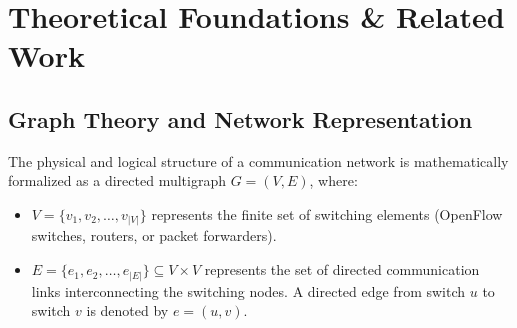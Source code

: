 \chapter{Theoretical Foundations \& Related Work}
\label{chap:theory}

\section{Graph Theory and Network Representation}
The physical and logical structure of a communication network is mathematically formalized as a directed multigraph $G = (V, E)$, where:
\begin{itemize}
    \item $V = \{v_1, v_2, \dots, v_{|V|}\}$ represents the finite set of switching elements (OpenFlow switches, routers, or packet forwarders).
    \item $E = \{e_1, e_2, \dots, e_{|E|}\} \subseteq V \times V$ represents the set of directed communication links interconnecting the switching nodes. A directed edge from switch $u$ to switch $v$ is denoted by $e = (u, v)$.
\end{itemize}

